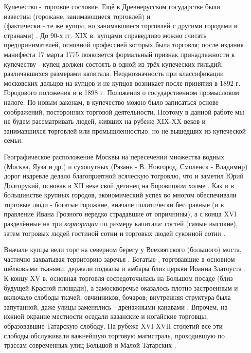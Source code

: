 \documentclass[a4paper,12pt]{article}
\begin{document}
Купечество - торговое сословие. Ещё в Древнерусском государстве были известны \rk (горожане, занимающиеся торговлей)  и \rk \\ (фактически - те же купцы, но занимавшиеся торговлей с другими городами и странами) \cite{dic}. До 90-х гг. XIX в. купцами справедливо можно считать предпринимателей, основной профессией которых была торговля; после издания манифеста 17 марта 1775 появляется формальный признак принадлежности к купечеству -  купец должен состоять в одной из трёх купеческих гильдий, различавшихся размерами капитала\cite{rustrana}.
Неоднозначность при классификации московских дельцов на купцов и не купцов возникает после принятия в 1892 г. Городового положения и в 1898 г. Положения о государственном промысловом налоге. По новым законам, в купечество можно было записаться  основе соображений, посторонних торговой деятельности\rk \cite{burishk}. Поэтому в данной работе мы не будем рассматривать людей, живших на рубеже XIX-XX веков и занимавшихся торговлей или промышленностью, но не вышедших из купеческой семьи. 


Географическое расположение Москвы на пересечении множества водных (Москва, Яуза и др.) и сухопутных (Рязань - В. Новгород, Смоленск - Владимир) дорог издревле делало благоприятной всяческую тогровлю, что и заметил Юрий Долгорукий, основав в XII веке свой детинец на Боровицком холме \cite{besed}. Как и в большинстве крупных городов, экономический успех во многом обеспечивали торговые люди - богатые горожане, вначале политически бесправные (и в правление Ивана Грозного нередко страдавшие от опричнины), а с конца XVI  разделённые на три \emph{корпорации} по размеру капитала: гостей (самые высокие), затем тогровых людей гостиной сотни и торговых людей суконной сотни \cite{burishk}.


\color{red} 
\color{black}

Вначале купцы вели торг на северном берегу у Всехвятского (большого) моста, частично захватывая территорию заречья \cite{zamosk}. Богатые \rk, торговавшие в основном шёлковыми тканями, держали подвалы и амбары близ церкви Иоанна Златоуста \cite{burishk}. К концу XV в. основная торговля сосредоточилась на Большом посаде (близ будущей Красной площади), а замоскворечье оказалось плотно застроенным и включало слободы ткачей, овчинников, бочаров; внутренняя структура была запутанной, даже улицы заменялись \rk - дренажными канавами \cite{besed}. Впрочем, на южной окраине местности оседали казанские и ногайские торговцы, образовавшие Татарскую слободу. На рубеже XVI-XVII столетий все эти слободы обслуживали важнейшую торговую магистраль, проходившую по трассам современных улиц Большой и Малой Татарских \cite{zamosk}. 
\end{document}
